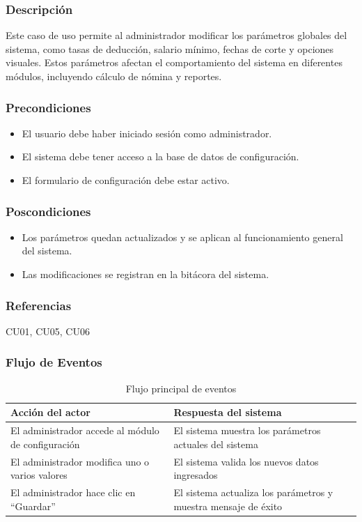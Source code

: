 \subsubsection*{Descripción}
Este caso de uso permite al administrador modificar los parámetros globales del sistema, como tasas de deducción, salario mínimo, fechas de corte y opciones visuales. Estos parámetros afectan el comportamiento del sistema en diferentes módulos, incluyendo cálculo de nómina y reportes.

\subsubsection*{Precondiciones}
\begin{itemize}
	\item El usuario debe haber iniciado sesión como administrador.
	\item El sistema debe tener acceso a la base de datos de configuración.
	\item El formulario de configuración debe estar activo.
\end{itemize}

\subsubsection*{Poscondiciones}
\begin{itemize}
	\item Los parámetros quedan actualizados y se aplican al funcionamiento general del sistema.
	\item Las modificaciones se registran en la bitácora del sistema.
\end{itemize}

\subsubsection*{Referencias}
CU01, CU05, CU06

\subsubsection*{Flujo de Eventos}
\begin{table}[h]
	\centering
	\caption{Flujo principal de eventos}
	\begin{tabular}{|p{7cm}|p{7cm}|}
		\hline
		\textbf{Acción del actor}                          & \textbf{Respuesta del sistema}                                 \\ \hline
		El administrador accede al módulo de configuración & El sistema muestra los parámetros actuales del sistema         \\ \hline
		El administrador modifica uno o varios valores     & El sistema valida los nuevos datos ingresados                  \\ \hline
		El administrador hace clic en “Guardar”            & El sistema actualiza los parámetros y muestra mensaje de éxito \\ \hline
	\end{tabular}
\end{table}

